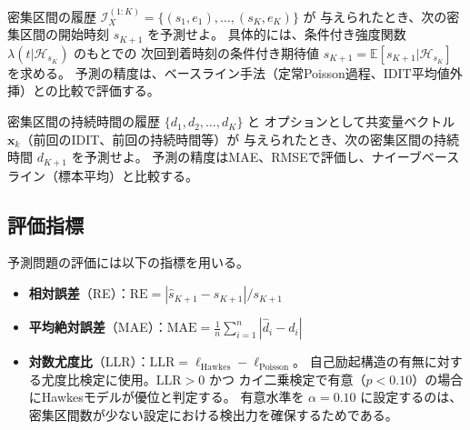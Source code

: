 \begin{problem}[次回発生時刻予測]\label{prob:arrival}
  密集区間の履歴 $\mathcal{I}_X^{(1:K)} = \{(s_1, e_1), \ldots, (s_K, e_K)\}$ が
  与えられたとき、次の密集区間の開始時刻 $s_{K+1}$ を予測せよ。
  具体的には、条件付き強度関数 $\lambda(t|\mathcal{H}_{s_K})$ のもとでの
  次回到着時刻の条件付き期待値
  $\hat{s}_{K+1} = \mathbb{E}[s_{K+1} | \mathcal{H}_{s_K}]$
  を求める。
  予測の精度は、ベースライン手法（定常Poisson過程、IDIT平均値外挿）との比較で評価する。
\end{problem}

\begin{problem}[持続時間予測]\label{prob:duration}
  密集区間の持続時間の履歴 $\{d_1, d_2, \ldots, d_K\}$ と
  オプションとして共変量ベクトル $\mathbf{x}_k$（前回のIDIT、前回の持続時間等）が
  与えられたとき、次の密集区間の持続時間 $d_{K+1}$ を予測せよ。
  予測の精度はMAE、RMSEで評価し、ナイーブベースライン（標本平均）と比較する。
\end{problem}

\subsection{評価指標}

予測問題の評価には以下の指標を用いる。
\begin{itemize}
  \item \textbf{相対誤差}（RE）：$\mathrm{RE} = |{\hat{s}_{K+1} - s_{K+1}}| / {s_{K+1}}$
  \item \textbf{平均絶対誤差}（MAE）：$\mathrm{MAE} = \frac{1}{n}\sum_{i=1}^{n}|\hat{d}_i - d_i|$
  \item \textbf{対数尤度比}（LLR）：$\mathrm{LLR} = \ell_{\text{Hawkes}} - \ell_{\text{Poisson}}$。
    自己励起構造の有無に対する尤度比検定に使用。$\mathrm{LLR} > 0$ かつ
    カイ二乗検定で有意（$p < 0.10$）の場合にHawkesモデルが優位と判定する。
    有意水準を $\alpha = 0.10$ に設定するのは、
    密集区間数が少ない設定における検出力を確保するためである。
\end{itemize}
